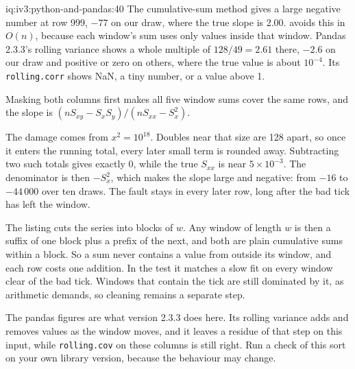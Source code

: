 \begin{solution}{iq:iv3:python-and-pandas:40}
The cumulative-sum method gives a large negative number at row 999, $-77$ on our draw, where the true slope is 2.00.  avoids this in $O(n)$, because each window's sum uses only values inside that window. Pandas 2.3.3's rolling variance shows a whole multiple of $128/49 = 2.61$ there, $-2.6$ on our draw and positive or zero on others, where the true value is about $10^{-4}$. Its \texttt{rolling.corr} shows NaN, a tiny number, or a value above 1.
\label{lst:iv3:pp:rollbeta}

Masking both columns first makes all five window sums cover the same rows, and the slope is $(n S_{xy} - S_x S_y) / (n S_{xx} - S_x^2)$.

The damage comes from $x^2 = 10^{18}$. Doubles near that size are 128 apart, so once it enters the running total, every later small term is rounded away. Subtracting two such totals gives exactly 0, while the true $S_{xx}$ is near $5 \times 10^{-3}$. The denominator is then $-S_x^2$, which makes the slope large and negative: from $-16$ to $-44\,000$ over ten draws. The fault stays in every later row, long after the bad tick has left the window.

The listing cuts the series into blocks of $w$. Any window of length $w$ is then a suffix of one block plus a prefix of the next, and both are plain cumulative sums within a block. So a sum never contains a value from outside its window, and each row costs one addition. In the test it matches a slow fit on every window clear of the bad tick. Windows that contain the tick are still dominated by it, as arithmetic demands, so cleaning remains a separate step.

The pandas figures are what version 2.3.3 does here. Its rolling variance adds and removes values as the window moves, and it leaves a residue of that step on this input, while \texttt{rolling.cov} on these columns is still right. Run a check of this sort on your own library version, because the behaviour may change.

\end{solution}
